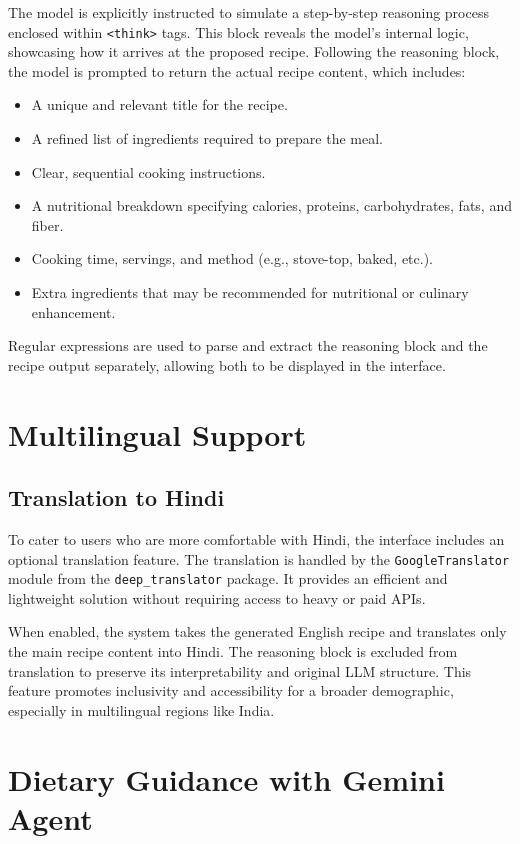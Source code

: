 \documentclass[letterpaper,11pt]{report}
\begin{document}
The model is explicitly instructed to simulate a step-by-step reasoning process enclosed within \texttt{<think>} tags. This block reveals the model’s internal logic, showcasing how it arrives at the proposed recipe. Following the reasoning block, the model is prompted to return the actual recipe content, which includes:

\begin{itemize}
  \item A unique and relevant title for the recipe.
  \item A refined list of ingredients required to prepare the meal.
  \item Clear, sequential cooking instructions.
  \item A nutritional breakdown specifying calories, proteins, carbohydrates, fats, and fiber.
  \item Cooking time, servings, and method (e.g., stove-top, baked, etc.).
  \item Extra ingredients that may be recommended for nutritional or culinary enhancement.
\end{itemize}

Regular expressions are used to parse and extract the reasoning block and the recipe output separately, allowing both to be displayed in the interface.

\section{Multilingual Support}

\subsection{Translation to Hindi}

To cater to users who are more comfortable with Hindi, the interface includes an optional translation feature. The translation is handled by the \texttt{GoogleTranslator} module from the \texttt{deep\_translator} package. It provides an efficient and lightweight solution without requiring access to heavy or paid APIs.

When enabled, the system takes the generated English recipe and translates only the main recipe content into Hindi. The reasoning block is excluded from translation to preserve its interpretability and original LLM structure. This feature promotes inclusivity and accessibility for a broader demographic, especially in multilingual regions like India.

\section{Dietary Guidance with Gemini Agent}
\end{document}
